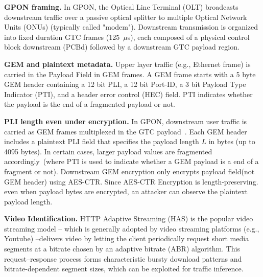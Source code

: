 \documentclass[sigconf,anonymous]{acmart}
\begin{document}
\noindent\textbf{GPON framing.}
In GPON, the Optical Line Terminal (OLT) broadcasts downstream traffic over a passive optical splitter to multiple Optical Network Units (ONUs) (typically called "modem"). Downstream transmission is organized into fixed duration GTC frames (125~$\mu$s), each composed of a physical control block downstream (PCBd) followed by a downstream GTC payload region.
~\cite{itu-g9843} %

\noindent\textbf{GEM and plaintext metadata.}
Upper layer traffic (e.g., Ethernet frame) is carried in the Payload Field in GEM frames. A GEM frame starts with a 5 byte GEM header containing a 12 bit PLI, a 12 bit Port-ID, a 3 bit Payload Type Indicator (PTI), and a header error control (HEC) field. PTI indicates whether the payload is the end of a fragmented payload or not. %
~\cite{itu-g9843} %

\noindent\textbf{PLI length even under encryption.}
In GPON, downstream user traffic is carried as GEM frames multiplexed in the GTC payload~\cite{itu-g9843}.
Each GEM header includes a plaintext PLI field that specifies the payload length $L$ in bytes (up to 4095 bytes). In certain cases, larger payload values are fragmented accordingly~\cite{itu-g9843}(where PTI is used to indicate whether a GEM payload is a end of a fragment or not).
Downstream GEM encryption only encrypts payload field(not GEM header) using AES-CTR.
Since AES-CTR Encryption is length-preserving. even when payload bytes are encrypted, an attacker can observe the plaintext payload length.

\noindent\textbf{Video Identification.} HTTP Adaptive Streaming (HAS) is the popular video streaming model -- which is generally adopted by video streaming platforms (e.g., Youtube) --delivers video by letting the client periodically request short media segments at a bitrate chosen by an adaptive bitrate (ABR) algorithm. This request--response process forms characteristic bursty download patterns and bitrate-dependent segment sizes, which can be exploited for traffic inference.~\cite{bae-sec22}
\end{document}
